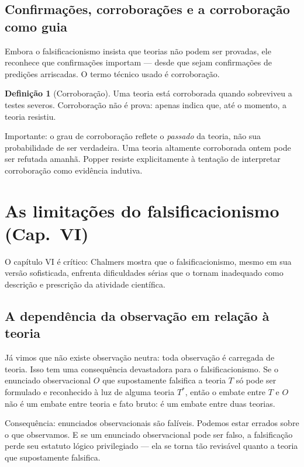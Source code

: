 \documentclass[9pt,a4paper]{extarticle}
\newcommand{\impt}[1]{\textcolor{important}{#1}}
\newcommand{\ntc}[1]{\textcolor{notice}{#1}}
\theoremstyle{definition}
\newtheorem{definition}{Definição}[section]
\begin{document}
\subsection{Confirmações, corroborações e a corroboração como guia}

Embora o falsificacionismo insista que teorias não podem ser provadas, ele reconhece que \impt{confirmações importam} --- desde que sejam confirmações de predições arriscadas. O termo técnico usado é \impt{corroboração}.

\begin{definition}[Corroboração]
Uma teoria está \impt{corroborada} quando sobreviveu a testes severos. Corroboração não é prova: apenas indica que, até o momento, a teoria resistiu.
\end{definition}

\ntc{Importante:} o grau de corroboração reflete o \emph{passado} da teoria, não sua probabilidade de ser verdadeira. Uma teoria altamente corroborada ontem pode ser refutada amanhã. Popper resiste explicitamente à tentação de interpretar corroboração como evidência indutiva.

\section{As limitações do falsificacionismo (Cap.~VI)}

O capítulo VI é crítico: Chalmers mostra que o falsificacionismo, mesmo em sua versão sofisticada, enfrenta dificuldades sérias que o tornam \impt{inadequado} como descrição e prescrição da atividade científica.

\subsection{A dependência da observação em relação à teoria}

Já vimos que não existe observação neutra: toda observação é \impt{carregada de teoria}. Isso tem uma consequência devastadora para o falsificacionismo. Se o enunciado observacional $O$ que supostamente falsifica a teoria $T$ só pode ser formulado e reconhecido à luz de alguma teoria $T^*$, então o embate entre $T$ e $O$ não é um embate entre teoria e fato bruto: é um embate entre duas teorias.

\ntc{Consequência:} enunciados observacionais são \impt{falíveis}. Podemos estar errados sobre o que observamos. E se um enunciado observacional pode ser falso, a falsificação perde seu estatuto lógico privilegiado --- ela se torna tão revisável quanto a teoria que supostamente falsifica.
\end{document}
